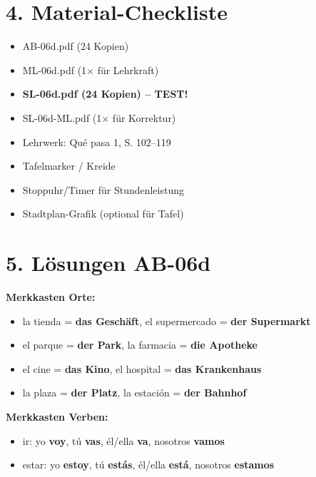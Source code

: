 \documentclass[11pt, a4paper]{article}
\newcommand{\sequenz}{06}
\newcommand{\block}{d}
\newcommand{\lerngruppengroesse}{24}
\newcommand{\loesung}[1]{\textcolor{loesung}{\textbf{#1}}}
\begin{document}
\section*{4. Material-Checkliste}

\begin{materialbox}
\begin{itemize}[label=$\square$]
    \item AB-\sequenz\block.pdf (\lerngruppengroesse{} Kopien)
    \item ML-\sequenz\block.pdf (1$\times$ für Lehrkraft)
    \item \textbf{SL-\sequenz\block.pdf (\lerngruppengroesse{} Kopien) -- TEST!}
    \item SL-\sequenz\block-ML.pdf (1$\times$ für Korrektur)
    \item Lehrwerk: Qué pasa 1, S. 102--119
    \item Tafelmarker / Kreide
    \item Stoppuhr/Timer für Stundenleistung
    \item Stadtplan-Grafik (optional für Tafel)
\end{itemize}
\end{materialbox}

\section*{5. Lösungen AB-\sequenz\block}

\textbf{Merkkasten Orte:}
\begin{itemize}
    \item la tienda = \loesung{das Geschäft}, el supermercado = \loesung{der Supermarkt}
    \item el parque = \loesung{der Park}, la farmacia = \loesung{die Apotheke}
    \item el cine = \loesung{das Kino}, el hospital = \loesung{das Krankenhaus}
    \item la plaza = \loesung{der Platz}, la estación = \loesung{der Bahnhof}
\end{itemize}

\textbf{Merkkasten Verben:}
\begin{itemize}
    \item ir: yo \loesung{voy}, tú \loesung{vas}, él/ella \loesung{va}, nosotros \loesung{vamos}
    \item estar: yo \loesung{estoy}, tú \loesung{estás}, él/ella \loesung{está}, nosotros \loesung{estamos}
\end{itemize}
\end{document}
